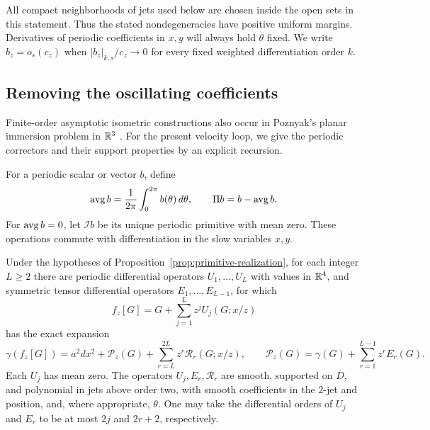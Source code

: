 All compact neighborhoods of jets used below are chosen inside the open
sets in this statement.  Thus the stated nondegeneracies have positive
uniform margins.  Derivatives of periodic coefficients in $x,y$ will always
hold $\theta$ fixed.  We write $b_z=o_s(c_z)$ when
$|b_z|_{k,s}/c_z\to0$ for every fixed weighted differentiation order $k$.

\subsection{Removing the oscillating coefficients}

Finite-order asymptotic isometric constructions also occur in Poznyak's
planar immersion problem in $\mathbb{R}^3$ \cite[\S2.3, Theorem~5]{Poznyak1973}.
For the present velocity loop, we give the periodic correctors and their
support properties by an explicit recursion.

For a periodic scalar or vector $b$, define
\[
 \operatorname{avg} b=\frac1{2\pi}\int_0^{2\pi}b(\theta)\,d\theta,
 \qquad \Pi b=b-\operatorname{avg} b.
\]
For $\operatorname{avg} b=0$, let $\mathcal I b$ be its unique periodic primitive with
mean zero.  These operations commute with differentiation in the slow
variables $x,y$.

\begin{lemma}
\label{lem:finite-periodic-expansion}
Under the hypotheses of Proposition~\ref{prop:primitive-realization}, for
each integer $L\ge2$ there are periodic differential operators
$U_1,\ldots,U_L$ with values in $\mathbb{R}^4$, and symmetric tensor differential
operators $E_1,\ldots,E_{L-1}$, for which
\begin{equation}
 f_z[G]=G+\sum_{j=1}^L z^jU_j(G;x/z)
 \label{eq:finite-ansatz}
\end{equation}
has the exact expansion
\begin{equation}
 \gamma(f_z[G])
   =a^2dx^2+\mathcal P_z(G)
        +\sum_{r=L}^{2L}z^r\mathcal R_r(G;x/z),
 \qquad
 \mathcal P_z(G)=\gamma(G)+\sum_{r=1}^{L-1}z^rE_r(G).
 \label{eq:finite-metric-expansion}
\end{equation}
Each $U_j$ has mean zero.  The operators $U_j,E_r,\mathcal R_r$ are smooth,
supported on $\overline D$, and polynomial in jets above order two, with
smooth coefficients in the $2$-jet and position, and, where appropriate,
$\theta$.  One may take the differential orders of $U_j$ and $E_r$ to be at
most $2j$ and $2r+2$, respectively.
\end{lemma}

